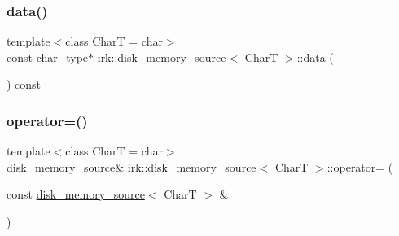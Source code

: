 \subsubsection{\texorpdfstring{data()}{data()}}
{\footnotesize\ttfamily template$<$class CharT  = char$>$ \\
const \mbox{\hyperlink{classirk_1_1disk__memory__source_a029ab1ba55fc543025c42ee3d7320dca}{char\+\_\+type}}$\ast$ \mbox{\hyperlink{classirk_1_1disk__memory__source}{irk\+::disk\+\_\+memory\+\_\+source}}$<$ CharT $>$\+::data (\begin{DoxyParamCaption}{ }\end{DoxyParamCaption}) const\hspace{0.3cm}{\ttfamily [inline]}}

\mbox{\label{classirk_1_1disk__memory__source_ad02ca60ed29684e3e32711599c93fdb3}} 
\subsubsection{\texorpdfstring{operator=()}{operator=()}\hspace{0.1cm}{\footnotesize\ttfamily [1/2]}}
{\footnotesize\ttfamily template$<$class CharT  = char$>$ \\
\mbox{\hyperlink{classirk_1_1disk__memory__source}{disk\+\_\+memory\+\_\+source}}\& \mbox{\hyperlink{classirk_1_1disk__memory__source}{irk\+::disk\+\_\+memory\+\_\+source}}$<$ CharT $>$\+::operator= (\begin{DoxyParamCaption}\item[{const \mbox{\hyperlink{classirk_1_1disk__memory__source}{disk\+\_\+memory\+\_\+source}}$<$ CharT $>$ \&}]{ }\end{DoxyParamCaption})\hspace{0.3cm}{\ttfamily [default]}}

\mbox{\label{classirk_1_1disk__memory__source_a451e7a9bb8a227a1f76d5108441c31f7}} 
